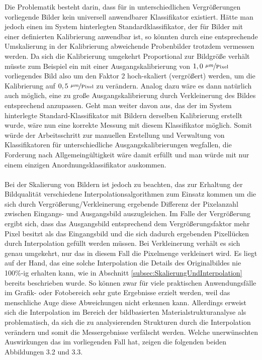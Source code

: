 \documentclass[
fontsize=10pt, 
listof = totoc,
parskip = half	
]{report}
\begin{document}
Die Problematik besteht darin, dass für in unterschiedlichen Vergrößerungen vorliegende Bilder kein universell anwendbarer Klassifikator existiert. Hätte man jedoch einen im System hinterlegten Standardklassifikator, der für Bilder mit einer definierten Kalibrierung anwendbar ist, so könnten durch eine entsprechende Umskalierung in der Kalibrierung abweichende Probenbilder trotzdem vermessen werden. Da sich die Kalibrierung umgekehrt Proportional zur Bildgröße verhält müsste zum Beispiel ein mit einer Ausgangskalibrierung von $1,0~\nicefrac{\mu m}{\text{Pixel}}$ vorliegendes Bild also um den Faktor 2 hoch-skaliert (vergrößert) werden, um die Kalibrierung auf $0,5~\nicefrac{\mu m}{\text{Pixel}}$ zu verändern. Analog dazu wäre es dann natürlich auch möglich, eine zu große Ausgangskalibrierung durch Verkleinerung des Bildes entsprechend anzupassen. Geht man weiter davon aus, das der im System hinterlegte Standard-Klassifikator mit Bildern derselben Kalibrierung erstellt wurde, wäre nun eine korrekte Messung mit diesem Klassifikator möglich. Somit würde der Arbeitsschritt zur manuellen Erstellung und Verwaltung von Klassifikatoren für unterschiedliche Ausgangskalibrierungen wegfallen, die Forderung nach Allgemeingültigkeit wäre damit erfüllt und man würde mit nur einem einzigen Anordnungsklassifikator auskommen.
\\\\
Bei der Skalierung von Bildern ist jedoch zu beachten, das zur Erhaltung der Bildqualität verschiedene Interpolationsalgorithmen zum Einsatz kommen um die sich durch Vergrößerung/Verkleinerung ergebende Differenz der Pixelanzahl zwischen Eingangs- und Ausgangsbild auszugleichen. Im Falle der Vergrößerung ergibt sich, dass das Ausgangsbild entsprechend dem Vergrößerungsfaktor mehr Pixel besitzt als das Eingangsbild und die sich dadurch ergebenden Pixellücken durch Interpolation gefüllt werden müssen. Bei Verkleinerung verhält es sich genau umgekehrt, nur das in diesem Fall die Pixelmenge verkleinert wird. Es liegt auf der Hand, das eine solche Interpolation die Details des Originalbildes nie 100\%-ig erhalten kann, wie in Abschnitt \ref{subsec:SkalierungUndInterpolation} bereits beschrieben wurde. So können zwar für viele praktischen Anwendungsfälle im Grafik- oder Fotobereich sehr gute Ergebnisse erzielt werden, weil das menschliche Auge diese Abweichungen nicht erkennen kann. Allerdings erweist sich die Interpolation im Bereich der bildbasierten Materialstrukturanalyse als problematisch, da sich  die zu analysierenden Strukturen durch die Interpolation verändern und somit die Messergebnisse verfälscht werden. Welche unerwünschten Auswirkungen das im vorliegenden Fall hat, zeigen die folgenden beiden Abbildungen 3.2 und 3.3.
\end{document}
